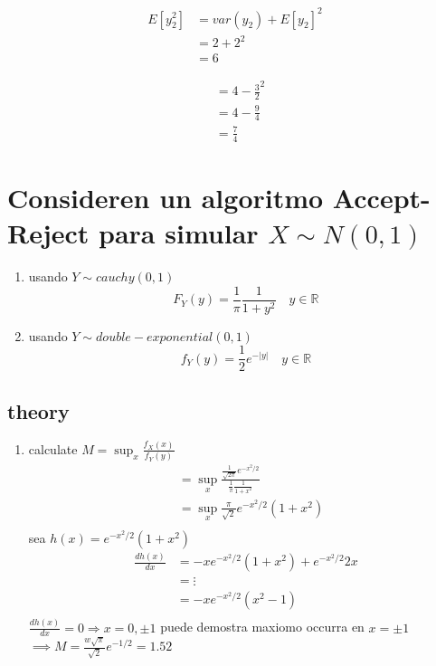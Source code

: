 \documentclass[10pt, oneside]{article}
\newcommand{\R}{\mathbb{R}}
\begin{document}
\[
	\begin{split}
		E[y_2^2] & = var(y_2) + E[y_2]^2 \\
		         & = 2 + 2^2             \\
		         & = 6
	\end{split}
\]

\[
	\begin{split}
		 & = 4- \frac{3}{2}^2 \\
		 & = 4 - \frac{9}{4}  \\
		 & = \frac{7}{4}
	\end{split}
\]

\section{Consideren un algoritmo Accept-Reject para simular $X \sim N(0,1)$}

\begin{enumerate}
	\item usando $Y \sim cauchy(0,1)$
	      $$
		      F_Y(y) = \frac{1}{\pi} \frac{1}{1+y^2} \quad y \in \R
	      $$
	\item usando $Y \sim double-exponential(0,1)$
	      $$
		      f_Y(y) = \frac{1}{2} e^{-|y|} \quad y \in \R
	      $$
\end{enumerate}

\subsection{theory}
\begin{enumerate}
	\item calculate $M = \sup_x \frac{f_X(x)}{f_Y(y)}$
	      \[
		      \begin{split}
			       & = \sup_x \frac{\frac{1}{\sqrt{2\pi}} e^{-x^2/2}}{\frac{1}{\pi} \frac{1}{1+x^2}} \\
			       & = \sup_x \frac{\pi}{\sqrt{2}} e^{-x^2/2} (1+x^2)                                \\
		      \end{split}
	      \]
	      sea $h(x) = e^{-x^2/2} (1+x^2)$
	      \[
		      \begin{split}
			      \frac{d h(x)}{dx} & = -x e^{-x^2/2}(1+x^2) + e^{-x^2/2} 2x \\
			                        & = \vdots                               \\
			                        & = -x e^{-x^2/2}(x^2-1)                 \\
		      \end{split}
	      \]
	      $\frac{d h(x)}{dx} = 0 \Rightarrow x = 0, \pm 1$
	      puede demostra maxiomo occurra en $x = \pm 1$
	      $\implies M = \frac{w \sqrt{\pi}}{\sqrt{2}} e^{-1/2} = 1.52$
\end{enumerate}
\end{document}
